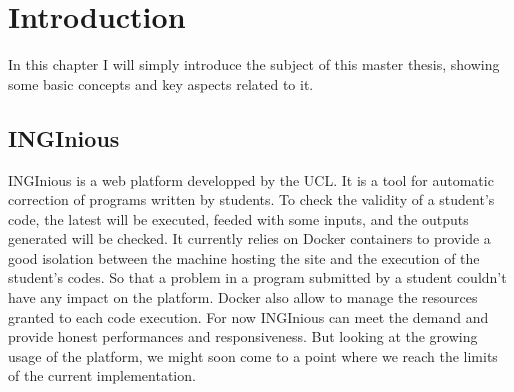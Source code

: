 \chapter{Introduction}

In this chapter I will simply introduce the subject of this master thesis, showing some basic concepts and key aspects related to it.

\section{INGInious}

INGInious is a web platform developped by the UCL.  It is a tool for automatic correction of programs written by students. To check the validity of a student's code, the latest will be executed, feeded with some inputs, and the outputs generated will be checked. It currently relies on Docker containers to provide a good isolation between the machine hosting the site and the execution of the student's codes.  So that a problem in a program submitted by a student couldn't have any impact on the platform.  Docker also allow to manage the resources granted to each code execution.  For now INGInious can meet the demand and provide honest performances and responsiveness.  But looking at the growing usage of the platform, we might soon come to a point where we reach the limits of the current implementation.

